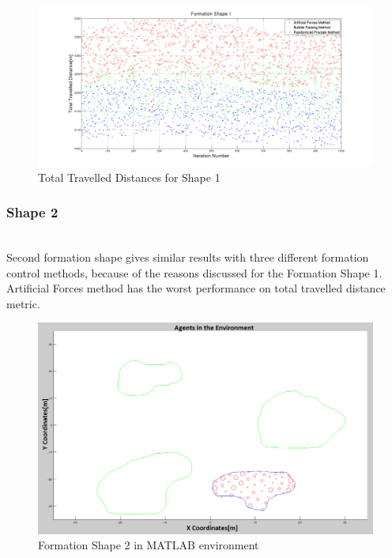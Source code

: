 \begin{figure}[H]
\caption{Total Travelled Distances for Shape 1} \label{total_disp_1}
\centerline{\includegraphics[scale = 0.28]{Total_Energy_Shape_1}}
\end{figure} 	
				
\subsubsection{Shape 2}\hspace{0pt} \\
Second formation shape gives similar results with three different formation control methods, because of the reasons discussed for the Formation Shape 1. Artificial Forces method has the worst performance on total travelled distance metric. 

\begin{figure}[H]
\caption{Formation Shape 2 in MATLAB environment}
\centerline{\includegraphics[scale = 0.27]{Trajectories_Formation_Shape_2_2}}
\end{figure} 	
		   
